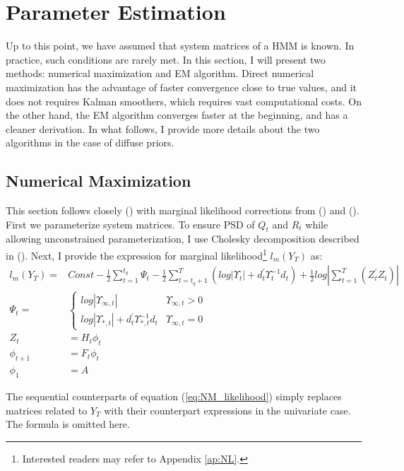 \documentclass[10pt]{article}
\numberwithin{equation}{section}
\begin{document}
\section{Parameter Estimation} \label{sec:param}
Up to this point, we have assumed that system matrices of a HMM is known. In practice, such conditions are rarely met. In this section, I will present two methods: numerical maximization and EM algorithm. Direct numerical maximization has the advantage of faster convergence close to true values, and it does not requires Kalman smoothers, which requires vast computational costs. On the other hand, the EM algorithm converges faster at the beginning, and has a cleaner derivation. In what follows, I provide more details about the two algorithms in the case of diffuse priors. 

\subsection{Numerical Maximization} \label{subsec:NM}
This section follows closely (\cite{durbin_koopman_2001}) with marginal likelihood corrections from (\cite{francke2010likelihood}) and (\cite{harville1974bayesian}). First we parameterize system matrices. To ensure PSD of $Q_t$ and $R_t$ while allowing unconstrained parameterization, I use Cholesky decomposition described in (\cite{pinheiro1996unconstrained}). Next, I provide the expression for marginal likelihood\footnote{Interested readers may refer to Appendix \ref{ap:NL}.} $l_m(Y_T)$ as:
\begin{align}
    l_m(Y_T) =& Const - \frac{1}{2}\sum_{t=1}^{t_q}\Psi_t - \frac{1}{2}\sum_{t=t_q+1}^{T}(log|\Upsilon_t| + d_t^{'}\Upsilon_t^{-1}d_t) + \frac{1}{2}log\left| \sum_{t=1}^{T}(Z_t^{'}Z_t) \right| \label{eq:NM_likelihood} \\
    \Psi_t =& \begin{cases}
        log|\Upsilon_{\infty,t}| & \Upsilon_{\infty,t} > 0 \\
        log|\Upsilon_{*,t}| + d_t^{'}\Upsilon_{*,t}^{-1}d_t & \Upsilon_{\infty,t}=0
    \end{cases} \nonumber \\
    Z_t &= H_t\phi_t \nonumber \\
    \phi_{t+1} &= F_t\phi_t \nonumber \\
    \phi_1 &= A \nonumber
\end{align}

The sequential counterparts of equation (\ref{eq:NM_likelihood}) simply replaces matrices related to $Y_T$ with their counterpart expressions in the univariate case. The formula is omitted here.
\end{document}
